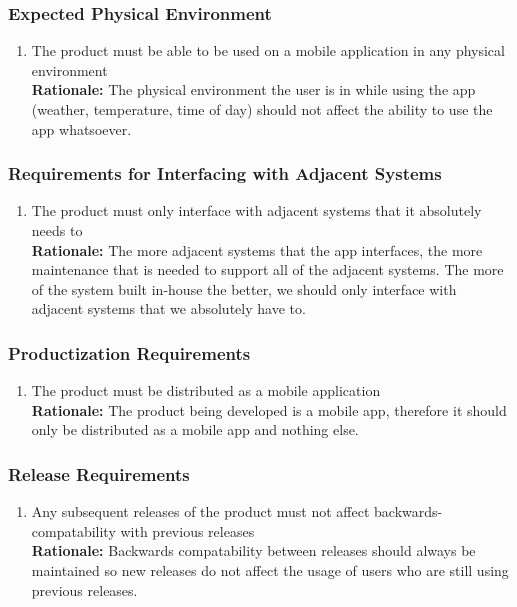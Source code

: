 \documentclass[]{article}
\begin{document}
\subsubsection{Expected Physical Environment}
\label{ssub:expected_physical_environment}
\begin{enumerate}[{OE-EPE}1. ]
	\item The product must be able to be used on a mobile application in any physical environment \\
	{\bf Rationale:} The physical environment the user is in while using the app (weather, temperature, time of day) should not affect the ability to use the app whatsoever.
\end{enumerate}

\subsubsection{Requirements for Interfacing with Adjacent Systems}
\label{ssub:requirements_for_interfacing_with_adjacent_systems}
\begin{enumerate}[{OE-IA}1. ]
	\item The product must only interface with adjacent systems that it absolutely needs to \\
	{\bf Rationale:} The more adjacent systems that the app interfaces, the more maintenance that is needed to support all of the adjacent systems. The more of the system built in-house the better, we should only interface with adjacent systems that we absolutely have to.
\end{enumerate}

\subsubsection{Productization Requirements}
\label{ssub:productization_requirements}
\begin{enumerate}[{OE-P}1. ]
	\item The product must be distributed as a mobile application \\
	{\bf Rationale:} The product being developed is a mobile app, therefore it should only be distributed as a mobile app and nothing else.
\end{enumerate}

\subsubsection{Release Requirements}
\label{ssub:release_requirements}
\begin{enumerate}[{OE-R}1. ]
	\item Any subsequent releases of the product must not affect backwards-compatability with previous releases \\
	{\bf Rationale:} Backwards compatability between releases should always be maintained so new releases do not affect the usage of users who are still using previous releases.
\end{enumerate}
\end{document}
